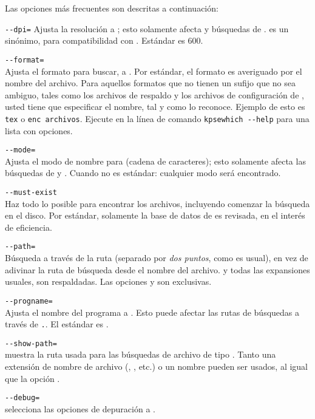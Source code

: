 \documentclass{article}
\begin{document}
Las opciones más frecuentes son descritas a continuación:

\begin{ttdescription}
	\item[\texttt{-{}-dpi=\var{num}}]\mbox{}
	Ajusta la resolución a ; esto solamente afecta
	 y búsquedas de .  es un sinónimo,
	para compatibilidad con . Estándar es 600.  
\item[\texttt{-{}-format=\var{name}}]\mbox{}\\
	Ajusta el formato para buscar, a . Por estándar,
	el formato es averiguado por el nombre del archivo. Para
	aquellos formatos que no tienen un sufijo que no sea ambiguo,
	tales como los archivos de respaldo \MP{} y los archivos de
	configuración de , usted tiene que especificar
	el nombre, tal y como \KPS{} lo reconoce. Ejemplo de esto es
	\texttt{tex} o \texttt{enc archivos}. Ejecute en la línea de
	comando \texttt{kpsewhich -{}-help} para una lista con opciones. 

\item[\texttt{-{}-mode=\var{string}}]\mbox{}\\
	Ajusta el modo de nombre para  (cadena de
caracteres); esto solamente
	afecta las búsquedas de  y . Cuando no es estándar:
	cualquier modo será encontrado. 
\item[\texttt{-{}-must-exist}]\mbox{}\\
	Haz todo lo posible para encontrar los archivos, incluyendo
	comenzar la búsqueda en el disco. Por estándar, solamente la
	base de datos de  es revisada, en el interés de
	eficiencia. 
\item[\texttt{-{}-path=\var{string}}]\mbox{}\\
	Búsqueda a través de la ruta  (separado
	por \emph{dos puntos}, como es usual), en vez de adivinar la ruta
	de búsqueda desde el nombre del archivo. \samp{//} y
	todas las expansiones usuales, son respaldadas. Las
	opciones  y  son
	exclusivas.
\item[\texttt{-{}-progname=\var{name}}]\mbox{}\\
	Ajusta el nombre del programa a \texttt{}.
	Esto puede afectar las rutas de búsquedas a través de
	\texttt{.}. El estándar es .
\item[\texttt{-{}-show-path=\var{name}}]\mbox{}\\
	muestra la ruta usada para las búsquedas de archivo de tipo
	\texttt{}.
	Tanto una extensión de nombre de archivo (, , etc.) o un
	nombre pueden ser usados, al igual que la opción .
\item[\texttt{-{}-debug=\var{num}}]\mbox{}\\
	selecciona las opciones de depuración a \texttt{}.
\end{ttdescription}
\end{document}
